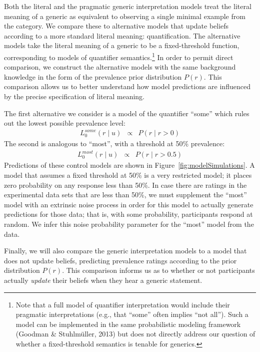 \documentclass[floatsintext,doc]{apa6}
\let\rmarkdownfootnote\footnote%
\def\footnote{\protect\rmarkdownfootnote}
\begin{document}
Both the literal and the pragmatic generic interpretation models treat the literal meaning of a generic as equivalent to observing a single minimal example from the category.
We compare these to alternative models that update beliefs according to a more standard literal meaning: quantification.
The alternative models take the literal meaning of a generic to be a fixed-threshold function, corresponding to models of quantifier semantics.\footnote{Note that a full model of quantifier interpretation would include their pragmatic interpretations (e.g., that \enquote{some} often implies \enquote{not all}). Such a model can be implemented in the same probabilistic modeling framework (Goodman \& Stuhlmüller, 2013) but does not directly address our question of whether a fixed-threshold semantics is tenable for generics.} 
In order to permit direct comparison, we construct the alternative models with the same background knowledge in the form of the prevalence prior distribution \(P(r)\).
This comparison allows us to better understand how model predictions are influenced by the precise specification of literal meaning.

The first alternative we consider is a model of the quantifier \enquote{some} which rules out the lowest possible prevalence level:
\begin{eqnarray}
L_0^{some}(r \mid u) &\propto&  P(r \mid r > 0)  \label{eq:someModel}
\end{eqnarray}
The second is analogous to \enquote{most}, with a threshold at 50\% prevalence:
\begin{eqnarray}
L_0^{most}(r \mid u) &\propto&  P(r \mid r > 0.5)  \label{eq:mostModel}
\end{eqnarray}
Predictions of these control models are shown in Figure~\ref{fig:modelSimulations}.
A model that assumes a fixed threshold at 50\% is a very restricted model; it places zero probability on any response less than 50\%.
In case there are ratings in the experimental data sets that are less than 50\%, we must supplement the \enquote{most} model with an extrinsic noise process in order for this model to actually generate predictions for those data; that is, with some probability, participants respond at random.
We infer this noise probability parameter for the \enquote{most} model from the data.

Finally, we will also compare the generic interpretation models to a model that does not update beliefs, predicting prevalence ratings according to the prior distribution \(P(r)\).
This comparison informs us as to whether or not participants actually \emph{update} their beliefs when they hear a generic statement.
\end{document}
